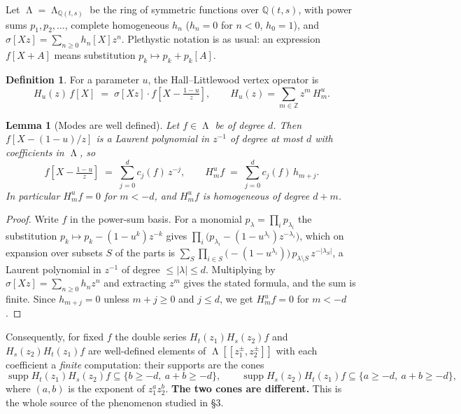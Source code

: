 \documentclass[11pt]{article}
\newtheorem{lemma}[theorem]{Lemma}
\theoremstyle{definition}
\newtheorem{definition}[theorem]{Definition}
\DeclareMathOperator{\Lam}{\Lambda}
\newcommand{\Z}{\mathbb{Z}}
\newcommand{\Hop}{H}
\begin{document}
Let $\Lam=\Lam_{\mathbb{Q}(t,s)}$ be the ring of symmetric functions over $\mathbb{Q}(t,s)$,
with power sums $p_1,p_2,\dots$, complete homogeneous $h_n$ ($h_n=0$ for $n<0$, $h_0=1$), and
$\sigma[Xz]=\sum_{n\ge0}h_n[X]z^n$. Plethystic notation is as usual: an expression
$f[X+A]$ means substitution $p_k\mapsto p_k+p_k[A]$.

\begin{definition}\label{def:H}
For a parameter $u$, the Hall--Littlewood vertex operator is
\[
  \Hop_u(z)\,f[X]\;=\;\sigma[Xz]\cdot f\!\left[X-\tfrac{1-u}{z}\right],
  \qquad \Hop_u(z)=\sum_{m\in\Z}z^m\,\Hop^{u}_m .
\]
\end{definition}

\begin{lemma}[Modes are well defined]\label{lem:modes}
Let $f\in\Lam$ be of degree $d$. Then $f[X-(1-u)/z]$ is a Laurent polynomial in $z^{-1}$ of
degree at most $d$ with coefficients in $\Lam$, so
\[
  f\!\left[X-\tfrac{1-u}{z}\right]\;=\;\sum_{j=0}^{d}c_j(f)\,z^{-j},
  \qquad
  \Hop^{u}_m f\;=\;\sum_{j=0}^{d}c_j(f)\,h_{m+j}.
\]
In particular $\Hop^{u}_m f=0$ for $m<-d$, and $\Hop^{u}_m f$ is homogeneous of degree $d+m$.
\end{lemma}

\begin{proof}
Write $f$ in the power-sum basis. For a monomial $p_\lambda=\prod_i p_{\lambda_i}$ the
substitution $p_k\mapsto p_k-(1-u^k)z^{-k}$ gives
$\prod_i\bigl(p_{\lambda_i}-(1-u^{\lambda_i})z^{-\lambda_i}\bigr)$, which on expansion over
subsets $S$ of the parts is
$\sum_S \prod_{i\in S}\bigl(-(1-u^{\lambda_i})\bigr)\,p_{\lambda\setminus S}\,z^{-|\lambda_S|}$,
a Laurent polynomial in $z^{-1}$ of degree $\le|\lambda|\le d$. Multiplying by
$\sigma[Xz]=\sum_{n\ge0}h_nz^n$ and extracting $z^m$ gives the stated formula, and the sum is
finite. Since $h_{m+j}=0$ unless $m+j\ge0$ and $j\le d$, we get $\Hop^u_mf=0$ for $m<-d$.
\end{proof}

Consequently, for fixed $f$ the double series $\Hop_t(z_1)\Hop_s(z_2)f$ and
$\Hop_s(z_2)\Hop_t(z_1)f$ are well-defined elements of
$\Lam[[z_1^{\pm},z_2^{\pm}]]$ with each coefficient a \emph{finite} computation:
their supports are the cones
\begin{equation}\label{eq:cones}
  \operatorname{supp}\Hop_t(z_1)\Hop_s(z_2)f\subseteq\{b\ge -d,\ a+b\ge -d\},
  \qquad
  \operatorname{supp}\Hop_s(z_2)\Hop_t(z_1)f\subseteq\{a\ge -d,\ a+b\ge -d\},
\end{equation}
where $(a,b)$ is the exponent of $z_1^az_2^b$. \textbf{The two cones are different.} This is
the whole source of the phenomenon studied in \S3.
\end{document}
